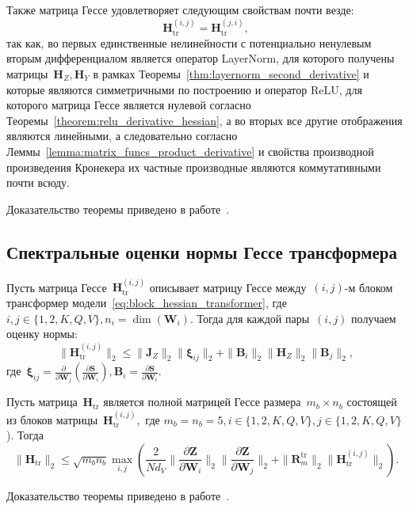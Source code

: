 \begin{theorem}
Также матрица Гессе удовлетворяет следующим свойствам почти везде:
\[
    \mathbf{H}_{\mathrm{tr}}^{(i,j)} = \mathbf{H}_{\mathrm{tr}}^{(j,i)},
\]
так как, во первых единственные нелинейности с потенциально ненулевым вторым дифференциалом является оператор LayerNorm, для которого получены матрицы~$\mathbf{H}_Z,\mathbf{H}_Y$ в рамках Теоремы~\ref{thm:layernorm_second_derivative} и которые являются симметричными по построению и оператор ReLU, для которого матрица Гессе является нулевой согласно Теоремы~\ref{theorem:relu_derivative_hessian}, а во вторых все другие отображения являются линейными, а следовательно согласно Леммы~\ref{lemma:matrix_funcs_product_derivative} и свойства производной произведения Кронекера их частные производные являются коммутативными почти всюду.
\end{theorem}
Доказательство теоремы приведено в работе~\cite{petrov2025curvaturegap}.

\subsection{Спектральные оценки нормы Гессе трансформера}

\begin{theorem}\label{thm:transformer_hessian_estimate}
Пусть матрица Гессе~$\mathbf{H}_{\mathrm{tr}}^{(i,j)}$ описывает матрицу Гессе между~$(i,j)$-м блоком трансформер модели~\eqref{eq:block_hessian_transformer}, где~$i,j\in\{1,2,K,Q,V\}, n_i=\dim(\mathbf{W}_i).$
Тогда для каждой пары~$(i,j)$ получаем оценку нормы:
\begin{equation}\label{eq:block_bound_transformer}
    \big\|\mathbf{H}_{\mathrm{tr}}^{(i,j)}\big\|_2 \le \|\mathbf{J}_Z\|_2 \|\boldsymbol{\xi}_{ij}\|_2 + \|\mathbf{B}_i\|_2 \|\mathbf{H}_Z\|_2 \|\mathbf{B}_j\|_2,
\end{equation}
где~$\boldsymbol{\xi}_{ij}=\frac{\partial}{\partial \mathbf{W}_j}\!\left(\frac{\partial \mathbf{S}}{\partial \mathbf{W}_i}\right), \mathbf{B}_i=\frac{\partial \mathbf{S}}{\partial \mathbf{W}_i}$. 

Пусть матрица~$\mathbf{H}_{\mathrm{tr}}$ является полной матрицей Гессе размера~$m_b \times n_b$ состоящей из блоков матрицы~$\mathbf{H}_{\mathrm{tr}}^{(i,j)},$ где $m_b=n_b=5,i\in\{1,2,K,Q,V\}, j\in\{1,2,K,Q,V\}$).
Тогда
\begin{equation}\label{eq:full_bound_transformer}
    \|\mathbf{H}_{\mathrm{tr}}\|_2 \le
    \sqrt{m_b n_b} \max \limits_{i,j} \left(\frac{2}{N d_V}\|\frac{\partial \mathbf{Z}}{\partial \mathbf{W}_i}\|_2 \|\frac{\partial \mathbf{Z}}{\partial \mathbf{W}_j}\|_2 + \|\mathbf{R}^{\text{tr}}_m\|_2 \|\mathbf{H}_{\text{tr}}^{(i,j)}\|_2 \right).
\end{equation}
\end{theorem}
Доказательство теоремы приведено в работе~\cite{petrov2025curvaturegap}.

